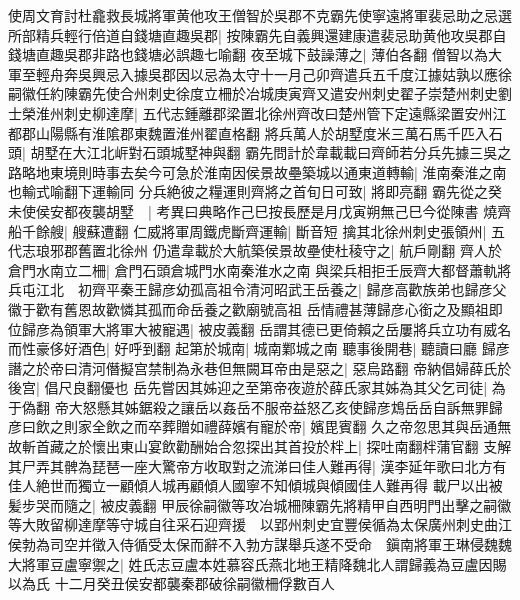 使周文育討杜龕救長城將軍黄他攻王僧智於吳郡不克霸先使寧遠將軍裴忌助之忌選所部精兵輕行倍道自錢塘直趣吳郡|{
	按陳霸先自義興還建康遣裴忌助黄他攻吳郡自錢塘直趣吳郡非路也錢塘必誤趣七喻翻}
夜至城下鼓譟薄之|{
	薄伯各翻}
僧智以為大軍至輕舟奔吳興忌入據吳郡因以忌為太守十一月己卯齊遣兵五千度江據姑孰以應徐嗣徽任約陳霸先使合州刺史徐度立柵於冶城庚寅齊又遣安州刺史翟子崇楚州刺史劉士榮淮州刺史柳達摩|{
	五代志鍾離郡梁置北徐州齊改曰楚州管下定遠縣梁置安州江都郡山陽縣有淮隂郡東魏置淮州翟直格翻}
將兵萬人於胡墅度米三萬石馬千匹入石頭|{
	胡墅在大江北㟁對石頭城墅神與翻}
霸先問計於韋載載曰齊師若分兵先據三吳之路略地東境則時事去矣今可急於淮南因侯景故壘築城以通東道轉輸|{
	淮南秦淮之南也輸式喻翻下運輸同}
分兵絶彼之糧運則齊將之首旬日可致|{
	將即亮翻}
霸先從之癸未使侯安都夜襲胡墅　|{
	考異曰典略作己巳按長歷是月戊寅朔無己巳今從陳書}
燒齊船千餘艘|{
	艘蘇遭翻}
仁威將軍周鐵虎斷齊運輸|{
	斷音短}
擒其北徐州刺史張領州|{
	五代志琅邪郡舊置北徐州}
仍遣韋載於大航築侯景故壘使杜稜守之|{
	航戶剛翻}
齊人於倉門水南立二柵|{
	倉門石頭倉城門水南秦淮水之南}
與梁兵相拒壬辰齊大都督蕭軌將兵屯江北　初齊平秦王歸彦幼孤高祖令清河昭武王岳養之|{
	歸彦高歡族弟也歸彦父徽于歡有舊恩故歡憐其孤而命岳養之歡廟號高祖}
岳情禮甚薄歸彦心銜之及顯祖即位歸彦為領軍大將軍大被寵遇|{
	被皮義翻}
岳謂其德已更倚賴之岳屢將兵立功有威名而性豪侈好酒色|{
	好呼到翻}
起第於城南|{
	城南鄴城之南}
聽事後開巷|{
	聽讀曰廳}
歸彦譖之於帝曰清河僭擬宫禁制為永巷但無闕耳帝由是惡之|{
	惡烏路翻}
帝納倡婦薛氏於後宫|{
	倡尺良翻優也}
岳先嘗因其姊迎之至第帝夜遊於薛氏家其姊為其父乞司徒|{
	為于偽翻}
帝大怒懸其姊鋸殺之讓岳以姦岳不服帝益怒乙亥使歸彦鴆岳岳自訴無罪歸彦曰飲之則家全飲之而卒葬贈如禮薛嬪有寵於帝|{
	嬪毘賓翻}
久之帝忽思其與岳通無故斬首藏之於懷出東山宴飲勸酬始合忽探出其首投於柈上|{
	探吐南翻柈蒲官翻}
支解其尸弄其髀為琵琶一座大驚帝方收取對之流涕曰佳人難再得|{
	漢李延年歌曰北方有佳人絶世而獨立一顧傾人城再顧傾人國寧不知傾城與傾國佳人難再得}
載尸以出被髪步哭而隨之|{
	被皮義翻}
甲辰徐嗣徽等攻冶城柵陳霸先將精甲自西明門出擊之嗣徽等大敗留柳達摩等守城自往采石迎齊援　以郢州刺史宜豐侯循為太保廣州刺史曲江侯勃為司空并徵入侍循受太保而辭不入勃方謀舉兵遂不受命　鎭南將軍王琳侵魏魏大將軍豆盧寧禦之|{
	姓氏志豆盧本姓慕容氏燕北地王精降魏北人謂歸義為豆盧因賜以為氏}
十二月癸丑侯安都襲秦郡破徐嗣徽柵俘數百人

